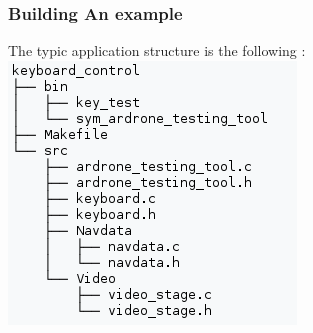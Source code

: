 \subsubsection{Building An example}
The typic application structure is the following :\\
\includegraphics{imgs/structure_projet.png}

